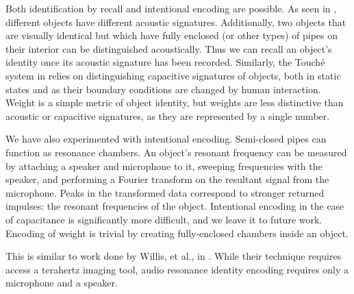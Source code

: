Both identification by recall and intentional encoding are possible.  As seen in \cite{Ono-touchandactivate}, different objects have different acoustic signatures.  Additionally, two objects that are visually identical but which have fully enclosed (or other types) of pipes on their interior can be distinguished acoustically.  Thus we can recall an object's identity once its acoustic signature has been recorded.  Similarly, the Touch\'{e} system in \cite{Sato-touche} relies on distinguishing capacitive signatures of objects, both in static states and as their boundary conditions are changed by human interaction.  Weight is a simple metric of object identity, but weights are less distinctive than acoustic or capacitive signatures, as they are represented by a single number.

We have also experimented with intentional encoding.  Semi-closed pipes can function as resonance chambers.  An object's resonant frequency can be measured by attaching a speaker and microphone to it, sweeping frequencies with the speaker, and performing a Fourier transform on the resultant signal from the microphone.  Peaks in the transformed data correspond to stronger returned impulses: the resonant frequencies of the object.  Intentional encoding in the case of capacitance is significantly more difficult, and we leave it to future work.  Encoding of weight is trivial by creating fully-enclosed chambers inside an object.

This is similar to work done by Willis, et al., in \cite{Willis-infrastructs}.  While their technique requires access a terahertz imaging tool, audio resonance identity encoding requires only a microphone and a speaker.